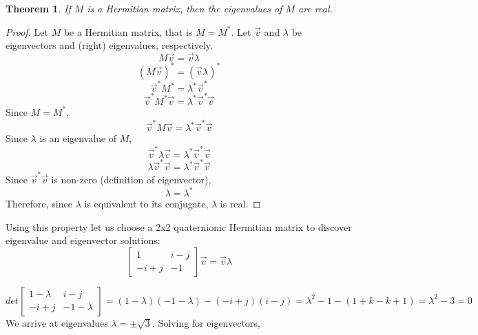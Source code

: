\documentclass{article}
\theoremstyle{plain}
\newtheorem*{theorem*}{Theorem}
\begin{document}
\begin{theorem*}
If $M$ is a Hermitian matrix, then the eigenvalues of $M$ are real.
\end{theorem*}
\begin{proof}
Let $M$ be a Hermitian matrix, that is $M=M^{*}$. Let $\vec{v}$ and $\lambda$ be eigenvectors and (right) eigenvalues, respectively.
$$M\vec{v}=\vec{v}\lambda$$
$$(M\vec{v})^*=(\vec{v}\lambda)^*$$
$$\vec{v}^*M^*=\lambda^*\vec{v}^*$$
$$\vec{v}^*M^*\vec{v}=\lambda^*\vec{v}^*\vec{v}$$
Since $M=M^*$,
$$\vec{v}^*M\vec{v}=\lambda^*\vec{v}^*\vec{v}$$
Since $\lambda$ is an eigenvalue of $M$,
$$\vec{v}^*\lambda\vec{v}=\lambda^*\vec{v}^*\vec{v}$$
$$\lambda\vec{v}^*\vec{v}=\lambda^*\vec{v}^*\vec{v}$$
Since $\vec{v}^*\vec{v}$ is non-zero (definition of eigenvector),
$$\lambda = \lambda^*$$
Therefore, since $\lambda$ is equivalent to its conjugate, $\lambda$ is real.
\end{proof}
\noindent Using this property let us choose a 2x2 quaternionic Hermitian matrix to discover eigenvalue and eigenvector solutions:
$$\begin{bmatrix}1 & i-j\\-i+j & -1\end{bmatrix}\vec{v}=\vec{v}\lambda$$

$$det\begin{bmatrix}1-\lambda & i-j\\-i+j & -1-\lambda\end{bmatrix} = (1-\lambda)(-1-\lambda)-(-i+j)(i-j) = \lambda^2-1-(1+k-k+1) = \lambda^2-3 = 0$$
We arrive at eigenvalues $\lambda=\pm\sqrt{3}$. Solving for eigenvectors,
\end{document}

